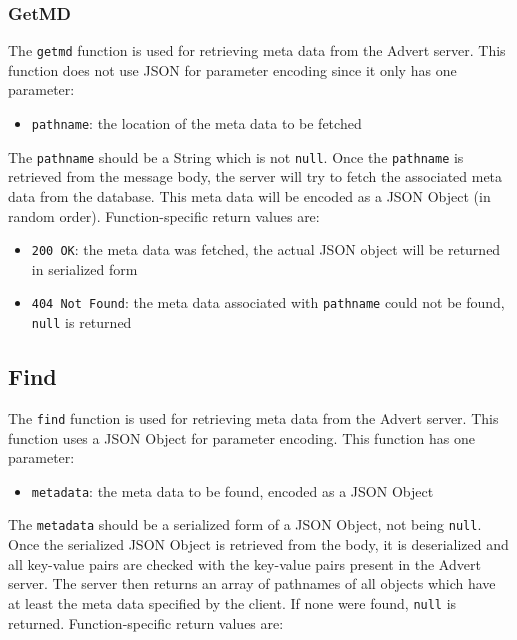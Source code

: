 \subsubsection{GetMD}
\label{getmd}
The \texttt{getmd} function is used for retrieving meta data from the Advert
server. This function does not use JSON for parameter encoding since it only has
one
parameter:

\begin{itemize}
  \item \texttt{pathname}: the location of the meta data to be fetched
\end{itemize}

The \texttt{pathname} should be a String which is not \texttt{null}. Once the
\texttt{pathname} is retrieved from the message body, the server will try to
fetch the associated meta data from the database. This meta data will be
encoded as a JSON Object (in random order). Function-specific return values are:

\begin{itemize}
  \item \texttt{200 OK}: the meta data was fetched, the actual JSON object will
  be returned in serialized form
  \item \texttt{404 Not Found}: the meta data associated with \texttt{pathname}
  could not be found, \texttt{null} is returned
\end{itemize}

\subsection{Find}
\label{find}
The \texttt{find} function is used for retrieving meta data from the Advert
server. This function uses a JSON Object for parameter encoding. This function
has one parameter:

\begin{itemize}
  \item \texttt{metadata}: the meta data to be found, encoded as a JSON Object
\end{itemize}

The \texttt{metadata} should be a serialized form of a JSON Object, not being
\texttt{null}. Once the serialized JSON Object is retrieved from the body, it
is deserialized and all key-value pairs are checked with the key-value pairs
present in the Advert server. The server then returns an array of
pathnames of all objects which have at least the meta data specified by the
client. If none were found, \texttt{null} is returned. Function-specific return
values are:

